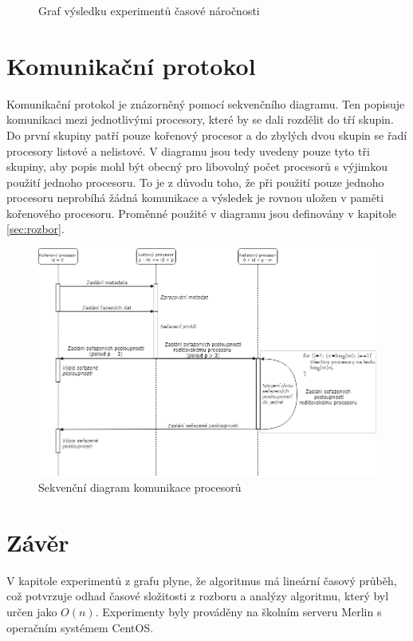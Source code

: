 \documentclass[12pt, a4paper]{article}
\begin{document}
\begin{figure}[h]\centering
	\label{fig:experimenty}
	\caption{Graf výsledku experimentů časové náročnosti}	
\end{figure}

\section{Komunikační protokol}
Komunikační protokol je znázorněný pomocí sekvenčního diagramu. Ten popisuje komunikaci mezi jednotlivými procesory, které by se dali rozdělit do tří skupin. Do první skupiny patří pouze kořenový procesor a do zbylých dvou skupin se řadí procesory listové a nelistové. V diagramu jsou tedy uvedeny pouze tyto tři skupiny, aby popis mohl být obecný pro libovolný počet procesorů s výjimkou použití jednoho procesoru. To je z důvodu toho, že při použití pouze jednoho procesoru neprobíhá žádná komunikace a výsledek je rovnou uložen v paměti kořenového procesoru. Proměnné použité v diagramu jsou definovány v kapitole \ref{sec:rozbor}.

\begin{figure}[H]
	\centering
	\includegraphics[scale=0.53]{pics/seq.png}
	\caption{Sekvenční diagram komunikace procesorů}	
\end{figure}


\section{Závěr}
V kapitole experimentů z grafu plyne, že algoritmus má lineární časový průběh, což potvrzuje odhad časové složitosti z rozboru a analýzy algoritmu, který byl určen jako $O(n)$. Experimenty byly prováděny na školním serveru Merlin s operačním systémem CentOS.
\end{document}

